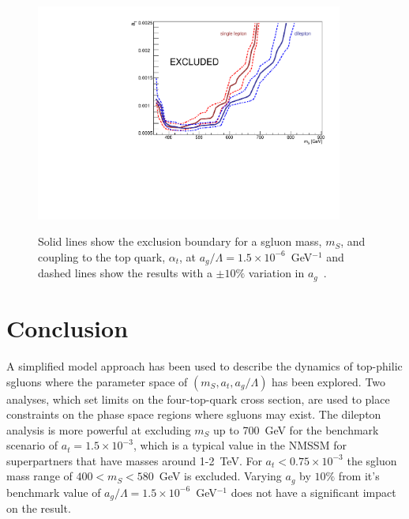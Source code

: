 \begin{figure}[h!]
\centering
    \includegraphics[width=0.9\textwidth]{images/Pheno/exclusion_agVariations.pdf}\\
    \caption{Solid lines show the exclusion boundary for a sgluon mass, $m_{S}$, and coupling to the top quark, $\alpha_{t}$, at $a_{g}/\Lambda = 1.5 \times 10^{-6}$~GeV$^{-1}$ and dashed lines show the results with a $\pm 10 \%$ variation in $a_{g}$~\cite{Beck201548}.}
    \label{fig:sgluonExclusion}
\end{figure}

\section{Conclusion \label{sec:sgluonConc}}

A simplified model approach has been used to describe the dynamics of top-philic sgluons where the parameter space of $(m_{S}, a_{t}, a_{g}/\Lambda)$ has been explored. Two analyses, which set limits on the four-top-quark cross section, are used to place constraints on the phase space regions where sgluons may exist. The dilepton analysis is more powerful at excluding $m_{S}$ up to 700~GeV for the benchmark scenario of $a_{t}=1.5\times10^{-3}$, which is a typical value in the NMSSM for superpartners that have masses around 1-2~TeV. For $a_{t}<0.75\times10^{-3}$ the sgluon mass range of $400<m_{S}<580$~GeV is excluded. Varying $a_{g}$ by $10\%$ from it's benchmark value of $a_{g}/\Lambda = 1.5 \times 10^{-6}$~GeV$^{-1}$ does not have a significant impact on the result.